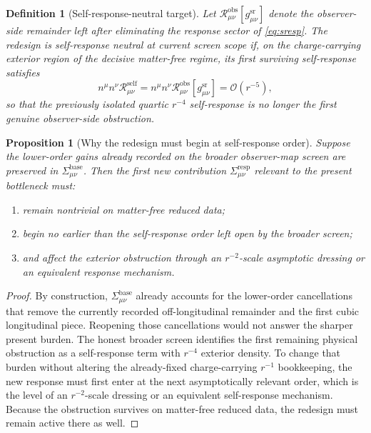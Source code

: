 \documentclass[11pt]{article}
\newcommand{\RedesignMetric}{g_{\mu\nu}^{\mathrm{sr}}}
\newcommand{\BaseShift}{\Sigma_{\mu\nu}^{\mathrm{base}}}
\newcommand{\ResponseShift}{\Sigma_{\mu\nu}^{\mathrm{resp}}}
\newcommand{\ObserverRem}{\mathcal R_{\mu\nu}^{\mathrm{obs}}}
\newcommand{\SelfRem}{\mathcal R_{\mu\nu}^{\mathrm{self}}}
\newtheorem{definition}{Definition}
\newtheorem{proposition}{Proposition}
\begin{document}
\begin{definition}[Self-response-neutral target]
\label{def:neutral}
Let \(\ObserverRem[\RedesignMetric]\) denote the observer-side remainder left after eliminating the response sector of \eqref{eq:sresp}. The redesign is \emph{self-response neutral at current screen scope} if, on the charge-carrying exterior region of the decisive matter-free regime, its first surviving self-response satisfies
\begin{equation}
n^\mu n^\nu \SelfRem
=
n^\mu n^\nu \ObserverRem[\RedesignMetric]
=
\mathcal O(r^{-5}),
\label{eq:neutral}
\end{equation}
so that the previously isolated quartic \(r^{-4}\) self-response is no longer the first genuine observer-side obstruction.
\end{definition}

\begin{proposition}[Why the redesign must begin at self-response order]
\label{prop:selforder}
Suppose the lower-order gains already recorded on the broader observer-map screen are preserved in \(\BaseShift\). Then the first new contribution \(\ResponseShift\) relevant to the present bottleneck must:
\begin{enumerate}
    \item remain nontrivial on matter-free reduced data;
    \item begin no earlier than the self-response order left open by the broader screen;
    \item and affect the exterior obstruction through an \(r^{-2}\)-scale asymptotic dressing or an equivalent response mechanism.
\end{enumerate}
\end{proposition}

\begin{proof}
By construction, \(\BaseShift\) already accounts for the lower-order cancellations that remove the currently recorded off-longitudinal remainder and the first cubic longitudinal piece. Reopening those cancellations would not answer the sharper present burden. The honest broader screen identifies the first remaining physical obstruction as a self-response term with \(r^{-4}\) exterior density. To change that burden without altering the already-fixed charge-carrying \(r^{-1}\) bookkeeping, the new response must first enter at the next asymptotically relevant order, which is the level of an \(r^{-2}\)-scale dressing or an equivalent self-response mechanism. Because the obstruction survives on matter-free reduced data, the redesign must remain active there as well.
\end{proof}
\end{document}
